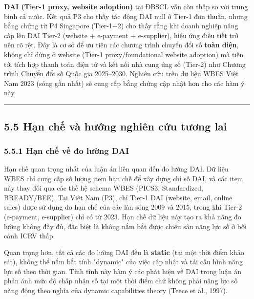 \documentclass[12pt,a4paper]{article}
\begin{document}
\textbf{DAI (Tier-1 proxy, website adoption)} tại ĐBSCL vẫn còn thấp so
với trung bình cả nước. Kết quả P3 cho thấy tác động DAI null ở Tier-1
đơn thuần, nhưng bằng chứng từ P4 Singapore (Tier-1+2) cho thấy rằng khi
doanh nghiệp nâng cấp lên DAI Tier-2 (website + e-payment + e-supplier),
hiệu ứng điều tiết trở nên rõ rệt. Đây là cơ sở để ưu tiên các chương
trình chuyển đổi số \textbf{toàn diện}, không chỉ dừng ở website (Tier-1
proxy/foundational website adoption) mà tiến tới tích hợp thanh toán
điện tử và kết nối nhà cung ứng số (Tier-2) như Chương trình Chuyển đổi
số Quốc gia 2025--2030. Nghiên cứu trên dữ liệu WBES Việt Nam 2023 (sóng
gần nhất) sẽ cung cấp bằng chứng cập nhật hơn cho các hàm ý này.

\begin{center}\rule{0.5\linewidth}{0.5pt}\end{center}

\hypertarget{55-hux1ea1n-chux1ebf-vuxe0-hux1b0ux1edbng-nghiuxean-cux1ee9u-tux1b0ux1a1ng-lai}{%
\subsection{5.5 Hạn chế và hướng nghiên cứu tương
lai}\label{55-hux1ea1n-chux1ebf-vuxe0-hux1b0ux1edbng-nghiuxean-cux1ee9u-tux1b0ux1a1ng-lai}}

\hypertarget{551-hux1ea1n-chux1ebf-vux1ec1-ux111o-lux1b0ux1eddng-dai}{%
\subsubsection{5.5.1 Hạn chế về đo lường
DAI}\label{551-hux1ea1n-chux1ebf-vux1ec1-ux111o-lux1b0ux1eddng-dai}}

Hạn chế quan trọng nhất của luận án liên quan đến đo lường DAI. Dữ liệu
WBES chỉ cung cấp số lượng item hạn chế để xây dựng chỉ số DAI, và các
item này thay đổi qua các thế hệ schema WBES (PICS3, Standardized,
BREADY/BEE). Tại Việt Nam (P3), chỉ Tier-1 DAI (website, email, online
sales) được sử dụng do hạn chế của các làn sóng 2009 và 2015, trong khi
Tier-2 (e-payment, e-supplier) chỉ có từ 2023. Hạn chế dữ liệu này tạo
ra khả năng đo lường không đầy đủ, đặc biệt là không nắm bắt được chiều
sâu năng lực số ở bối cảnh ICRV thấp.

Quan trọng hơn, tất cả các đo lường DAI đều là \textbf{static} (tại một
thời điểm khảo sát), không thể nắm bắt tính "dynamic" của việc cập nhật
và tái cấu hình năng lực số theo thời gian. Tính tĩnh này hàm ý các phát
hiện về DAI trong luận án phản ánh mức độ chấp nhận số tại một thời điểm
chứ không phải năng lực số năng động theo nghĩa của dynamic capabilities
theory (Teece et al., 1997).
\end{document}
